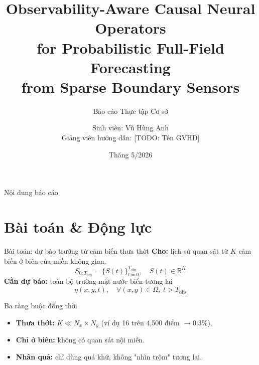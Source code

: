 \documentclass[11pt,aspectratio=169]{beamer}
\title[OVCNO --- Sparse Boundary Forecasting]{Observability-Aware Causal Neural Operators \\
for Probabilistic Full-Field Forecasting \\
from Sparse Boundary Sensors}
\subtitle{Báo cáo Thực tập Cơ sở}
\author[Vũ Hùng Anh]{Sinh viên: Vũ Hùng Anh \\
\small Giảng viên hướng dẫn: [TODO: Tên GVHD]}
\institute[PTIT]{Học viện Công nghệ Bưu chính Viễn thông (PTIT)}
\date{Tháng 5/2026}
\begin{document}

\begin{frame}[plain]
  \titlepage
\end{frame}

\begin{frame}{Nội dung báo cáo}
  \tableofcontents
\end{frame}

\section{Bài toán \& Động lực}

\begin{frame}{Bài toán: dự báo trường từ cảm biến thưa thớt}
  \textbf{Cho:} lịch sử quan sát từ $K$ cảm biến ở \alert{biên} của miền không gian.
  \[
  S_{0:T_{\mathrm{obs}}} = \{S(t)\}_{t=0}^{T_{\mathrm{obs}}}, \quad S(t) \in \mathbb{R}^K
  \]
  \textbf{Cần dự báo:} toàn bộ trường mặt nước biển tương lai
  \[
  \eta(x,y,t), \quad \forall (x,y) \in \Omega,\; t > T_{\mathrm{obs}}
  \]
  \vspace{4pt}
  \begin{block}{Ba ràng buộc đồng thời}
    \begin{itemize}\itemsep2pt
      \item \textbf{Thưa thớt:} $K \ll N_x \times N_y$ (ví dụ 16 trên 4{,}500 điểm $\to 0.3\%$).
      \item \textbf{Chỉ ở biên:} không có quan sát nội miền.
      \item \textbf{Nhân quả:} chỉ dùng quá khứ, không "nhìn trộm" tương lai.
    \end{itemize}
  \end{block}
\end{frame}
\end{document}

